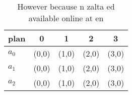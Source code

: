 \documentclass[a4paper]{article}
\begin{document}
\begin{table}
\begin{adjustbox}{width=0.5\columnwidth}
\begin{tabular}{|l|l|l|l|l|}
\hline
\textbf{plan} & \multicolumn{1}{c|}{\textbf{0}} & \multicolumn{1}{c|}{\textbf{1}} & \multicolumn{1}{c|}{\textbf{2}} & \multicolumn{1}{c|}{\textbf{3}} \\ \hline
\textbf{$a_0$}  & (0,0) & (1,0) & (2,0) & (3,0) \\ \hline
\textbf{$a_1$}  & (0,0) & (1,0) & (2,0) & (3,0) \\ \hline
\textbf{$a_2$}  & (0,0) & (1,0) & (2,0) & (3,0) \\ \hline
\end{tabular}
\end{adjustbox}
\caption{However because n zalta ed available online at en
}
\end{table}
\end{document}
